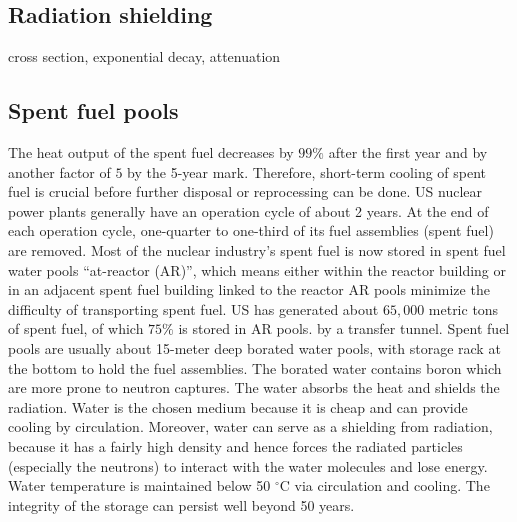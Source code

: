 \documentclass[nofootinbib,preprint,aps]{revtex4-1}
\begin{document}
    \subsection{Radiation shielding}
    cross section, exponential decay, attenuation
    \subsection{Spent fuel pools}
    The heat output of the spent fuel decreases by $99\%$ after the first year and by another factor of $5$
    by the 5-year mark.\cite{aa12} Therefore, short-term cooling of spent fuel is crucial before
    further disposal or reprocessing can be done.
    US nuclear power plants generally have an operation cycle of about 2 years. At the end of each operation cycle,
    one-quarter to one-third of its fuel assemblies (spent fuel) are removed.
    Most of the nuclear industry's spent fuel is now stored in spent fuel water pools ``at-reactor (AR)'',
    which means either within the reactor building or in an adjacent spent fuel building linked to the reactor
    AR pools minimize the difficulty of transporting spent fuel.\cite{iaea99}
    US has generated about $65,000$ metric tons of spent fuel, of which $75\%$ is stored in AR pools.\cite{a11}
    by a transfer tunnel. 
    Spent fuel pools  are usually about 15-meter deep borated water pools, with storage rack at the bottom to hold the fuel assemblies.
    The borated water contains boron which are more prone to neutron captures.
    The water absorbs the heat and shields the radiation. Water is the chosen medium because it is cheap and
    can provide cooling by circulation. Moreover, water can serve as a shielding from radiation, because it has a
    fairly high density and hence forces the radiated particles (especially the neutrons) to interact with
    the water molecules and lose energy. Water temperature is maintained
    below 50 $^\circ$C via circulation and cooling. The integrity of the storage can persist well beyond 
    50 years.\cite{a11, iaea99}
\end{document}
